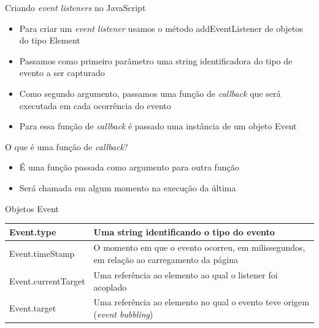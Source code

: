 \begin{frame}[fragile]{Criando \textit{event listeners} no JavaScript}
  \begin{itemize}
    \item Para criar um \textit{event listener} usamos o método addEventListener
          de objetos do tipo Element
    \item Passamos como primeiro parâmetro uma string identificadora do tipo de
          evento a ser capturado
    \item Como segundo argumento, passamos uma função de \textit{callback} que
          será executada em cada ocorrência do evento
    \item Para essa função de \textit{callback} é passado uma instância de um
          objeto Event
  \end{itemize}
  \begin{block}{O que é uma função de \textit{callback}?}
    \begin{itemize}
      \item É uma função passada como argumento para outra função
      \item Será chamada em algum momento na execução da última
    \end{itemize}
  \end{block}
\end{frame}

\begin{frame}{Objetos Event}
  \begin{figure}
    \centering
  \end{figure}
  \begin{table}
    \centering
    \begin{tabular}{|l|p{}|}
      \hline
      Event.type          & Uma string identificando o tipo do evento                                                 \\ \hline
      Event.timeStamp     & O momento em que o evento ocorreu, em milissegundos, em relação ao carregamento da página \\ \hline
      Event.currentTarget & Uma referência ao elemento ao qual o listener foi acoplado                                \\ \hline
      Event.target        & Uma referência ao elemento no qual o evento teve origem (\textit{event bubbling})         \\ \hline
    \end{tabular}
  \end{table}
\end{frame}

